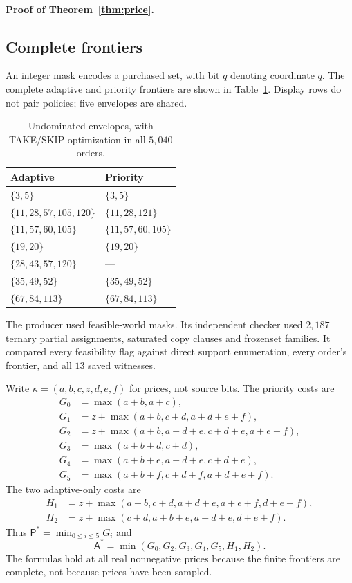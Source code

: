 \documentclass[pdflatex,sn-mathphys-num]{sn-jnl}
\newcommand{\A}{\mathsf{A}}
\newcommand{\Pcost}{\mathsf{P}}
\theoremstyle{thmstyleone}
\theoremstyle{thmstylethree}
\theoremstyle{thmstyletwo}
\begin{document}
\paragraph*{Proof of Theorem~\ref{thm:price}.}

\subsection{Complete frontiers}
An integer mask encodes a purchased set, with bit $q$ denoting coordinate $q$. The complete adaptive and priority frontiers are shown in Table~\ref{tab:frontiers}. Display rows do not pair policies; five envelopes are shared.
\begin{table}[ht]
\centering
\begin{tabular}{@{}ll@{}}\toprule
Adaptive & Priority\\\midrule
$\{3,5\}$ & $\{3,5\}$\\
$\{11,28,57,105,120\}$ & $\{11,28,121\}$\\
$\{11,57,60,105\}$ & $\{11,57,60,105\}$\\
$\{19,20\}$ & $\{19,20\}$\\
$\{28,43,57,120\}$ & ---\\
$\{35,49,52\}$ & $\{35,49,52\}$\\
$\{67,84,113\}$ & $\{67,84,113\}$\\\bottomrule
\end{tabular}
\caption{Undominated envelopes, with TAKE/SKIP optimization in all $5,040$ orders.}\label{tab:frontiers}
\end{table}
The producer used feasible-world masks. Its independent checker used $2,187$ ternary partial assignments, saturated copy clauses and frozenset families. It compared every feasibility flag against direct support enumeration, every order's frontier, and all $13$ saved witnesses.

Write $\kappa=(a,b,c,z,d,e,f)$ for prices, not source bits. The priority costs are
\begin{align*}
G_0&=\max(a+b,a+c),\\
G_1&=z+\max(a+b,c+d,a+d+e+f),\\
G_2&=z+\max(a+b,a+d+e,c+d+e,a+e+f),\\
G_3&=\max(a+b+d,c+d),\\
G_4&=\max(a+b+e,a+d+e,c+d+e),\\
G_5&=\max(a+b+f,c+d+f,a+d+e+f).
\end{align*}
The two adaptive-only costs are
\begin{align*}
H_1&=z+\max(a+b,c+d,a+d+e,a+e+f,d+e+f),\\
H_2&=z+\max(c+d,a+b+e,a+d+e,d+e+f).
\end{align*}
Thus $\Pcost^*=\min_{0\leq i\leq5}G_i$ and
\[
 \A^*=\min(G_0,G_2,G_3,G_4,G_5,H_1,H_2).
\]
The formulas hold at all real nonnegative prices because the finite frontiers are complete, not because prices have been sampled.
\end{document}

